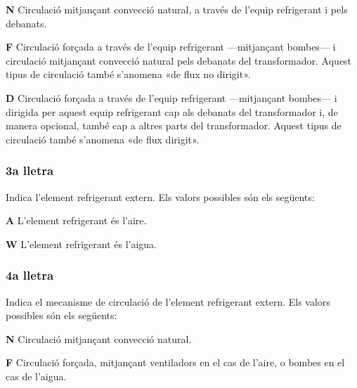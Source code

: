 \begin{list}{}
   {\setlength{\labelwidth}{10mm} \setlength{\leftmargin}{10mm} \setlength{\labelsep}{2mm}}
   \item[\textbf{N}] Circulació mitjançant convecció natural,
    a través de l'equip refrigerant i pels debanats.
   \item[\textbf{F}] Circulació forçada a través de l'equip refrigerant ---mitjançant bombes---
    i circulació mitjançant convecció natural pels debanats del
    transformador. Aquest tipus de circulació també s'anomena «de flux no
    dirigit».
   \item[\textbf{D}] Circulació forçada a través de l'equip refrigerant ---mitjançant bombes---
    i dirigida per aquest equip refrigerant cap als debanats del
    transformador i, de manera opcional, també cap a altres parts del transformador. Aquest
    tipus de circulació també s'anomena «de flux dirigit».
\end{list}
  

\subsubsection*{3a lletra}
 Indica l'element refrigerant extern. Els valors
possibles són els següents:

\begin{list}{}
   {\setlength{\labelwidth}{10mm} \setlength{\leftmargin}{10mm} \setlength{\labelsep}{2mm}}
   \item[\textbf{A}] L'element refrigerant és l'aire.
   \item[\textbf{W}] L'element refrigerant és l'aigua.
\end{list}
 

\subsubsection*{4a lletra}
 Indica el mecanisme de circulació de l'element
refrigerant extern. Els valors possibles són els següents:
\begin{list}{}
   {\setlength{\labelwidth}{10mm} \setlength{\leftmargin}{10mm} \setlength{\labelsep}{2mm}}
   \item[\textbf{N}] Circulació mitjançant convecció natural.
   \item[\textbf{F}] Circulació forçada, mitjançant ventiladors en el cas de
   l'aire, o bombes en el cas de l'aigua.
\end{list}
 

